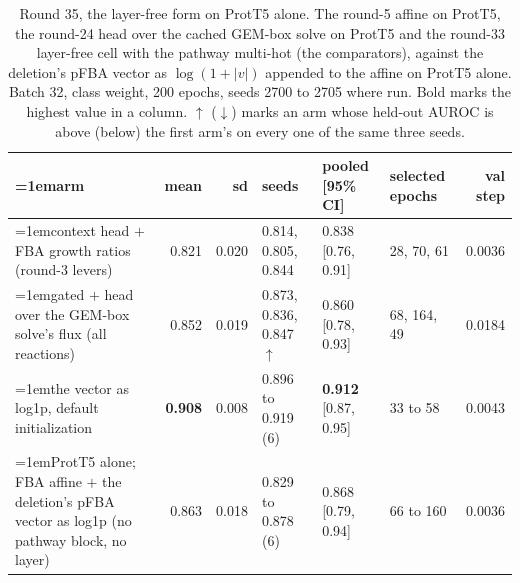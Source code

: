 \begin{table}[H]
  \centering
  \scriptsize
  \setlength{\tabcolsep}{2.5pt}
  \caption[Round 35, the layer-free form on ProtT5 alone]{Round 35, the layer-free form on ProtT5 alone. The round-5 affine on ProtT5, the round-24 head over the cached GEM-box solve on ProtT5 and the round-33 layer-free cell with the pathway multi-hot (the comparators), against the deletion's pFBA vector as $\log(1 + |v|)$ appended to the affine on ProtT5 alone. Batch 32, class weight, 200 epochs, seeds 2700 to 2705 where run. Bold marks the highest value in a column. $\uparrow$ ($\downarrow$) marks an arm whose held-out AUROC is above (below) the first arm's on every one of the same three seeds.}
  \label{tab:w51}
  \begin{tabular}{@{}>{\raggedright\hangindent=1em\hangafter=1\arraybackslash}p{81.1mm}rrlllr@{}}
    \hline
    arm & mean & sd & seeds & pooled [95\% CI] & selected epochs & val step \\
    \hline
    context head $+$ FBA growth ratios (round-3 levers) & 0.821 & 0.020 & 0.814, 0.805, 0.844 & 0.838 [0.76, 0.91] & 28, 70, 61 & 0.0036 \\
    gated $+$ head over the GEM-box solve's flux (all reactions) & 0.852 & 0.019 & 0.873, 0.836, 0.847 $\uparrow$ & 0.860 [0.78, 0.93] & 68, 164, 49 & 0.0184 \\
    the vector as log1p, default initialization & \textbf{0.908} & 0.008 & 0.896 to 0.919 (6) & \textbf{0.912} [0.87, 0.95] & 33 to 58 & 0.0043 \\
    ProtT5 alone; FBA affine $+$ the deletion's pFBA vector as log1p (no pathway block, no layer) & 0.863 & 0.018 & 0.829 to 0.878 (6) & 0.868 [0.79, 0.94] & 66 to 160 & 0.0036 \\
    \hline
  \end{tabular}
\end{table}
